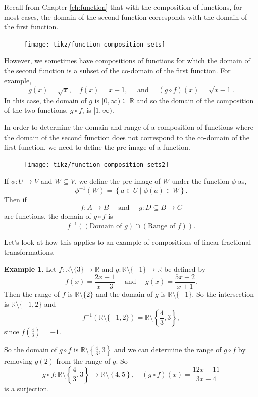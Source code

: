 \documentclass[
]{book}
\theoremstyle{definition}
\theoremstyle{definition}
\newtheorem{example}{Example}[chapter]
\theoremstyle{definition}
\theoremstyle{remark}
\begin{document}
Recall from Chapter \ref{ch:function} that with the composition of functions, for most cases, the domain of the second function corresponds with the domain of the first function.

\begin{figure}

{\centering \texttt{[image: tikz/function-composition-sets]} 

}

\end{figure}

However, we sometimes have compositions of functions for which the domain of the second function is a subset of the co-domain of the first function. For example,
\[g(x) = \sqrt{x}, \quad f(x)=x-1, \quad \mbox{ and } \quad (g\circ f)(x) = \sqrt{x-1}.\]
In this case, the domain of \(g\) is \([0,\infty) \subseteq \mathbb{R}\) and so the domain of the composition of the two functions, \(g\circ f\), is \([1,\infty)\).

In order to determine the domain and range of a composition of functions where the domain of the second function does not correspond to the co-domain of the first function, we need to define the pre-image of a function.

\begin{figure}

{\centering \texttt{[image: tikz/function-composition-sets2]} 

}

\end{figure}

If \(\phi:U\rightarrow V\) and \(W \subseteq V\), we define the pre-image of \(W\) under the function \(\phi\) as,
\[\phi^{-1}(W) = \left\{ a\in U \middle \vert \phi(a)\in W\right\}.\] Then if \[f:A\rightarrow B \quad \mbox{ and } \quad g:D\subseteq B \rightarrow C\] are functions, the domain of \(g\circ f\) is \[f^{-1} \left( (\mbox{Domain of } g) \cap (\mbox{Range of } f)\right).\]

Let's look at how this applies to an example of compositions of linear fractional transformations.

\begin{example}
\protect\hypertarget{exm:unnamed-chunk-257}{}{\label{exm:unnamed-chunk-257} }Let \(f:\mathbb{R}\setminus \{3\} \rightarrow \mathbb{R}\) and \(g:\mathbb{R}\setminus \{-1\} \rightarrow \mathbb{R}\) be defined by \[f(x) = \frac{2x-1}{x-3} \quad \mbox{ and } \quad g(x)=\frac{5x+2}{x+1}.\]
Then the range of \(f\) is \(\mathbb{R} \setminus \{2\}\) and the domain of \(g\) is \(\mathbb{R}\setminus \{-1\}\). So the intersection is \(\mathbb{R}\setminus \{-1,2\}\) and
\[f^{-1} \left(\mathbb{R} \setminus \{-1,2\} \right) = \mathbb{R} \setminus \left\{\frac{4}{3}, 3\right\},\] since \(f\left(\frac{4}{3}\right) = -1\).

So the domain of \(g\circ f\) is \(\mathbb{R} \setminus \left\{\frac{4}{3}, 3\right\}\) and we can determine the range of \(g\circ f\) by removing \(g(2)\) from the range of \(g\). So
\[g\circ f : \mathbb{R} \setminus \left\{\frac{4}{3}, 3\right\} \rightarrow \mathbb{R} \setminus \left\{ 4,5 \right\}, \quad (g\circ f) (x) = \frac{12x-11}{3x-4}\] is a surjection.
\end{example}
\end{document}
